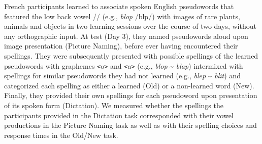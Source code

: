 \documentclass[
  english,
  man,floatsintext]{apa7}
\begin{document}
French participants learned to associate spoken English pseudowords that featured the low back vowel /\textscripta / (e.g., \emph{blop} /bl\textscripta p/) with images of rare plants, animals and objects in two learning sessions over the course of two days, without any orthographic input. At test (Day 3), they named pseudowords aloud upon image presentation (Picture Naming), before ever having encountered their spellings. They were subsequently presented with possible spellings of the learned pseudowords with graphemes \texttt{\textless{}}o\texttt{\textgreater{}} and \texttt{\textless{}}a\texttt{\textgreater{}} (e.g., \emph{blop} \textasciitilde{} \emph{blap}) intermixed with spellings for similar pseudowords they had not learned (e.g., \emph{blep} \textasciitilde{} \emph{blit}) and categorized each spelling as either a learned (Old) or a non-learned word (New). Finally, they provided their own spellings for each pseudoword upon presentation of its spoken form (Dictation). We measured whether the spellings the participants provided in the Dictation task corresponded with their vowel productions in the Picture Naming task as well as with their spelling choices and response times in the Old/New task.
\end{document}
